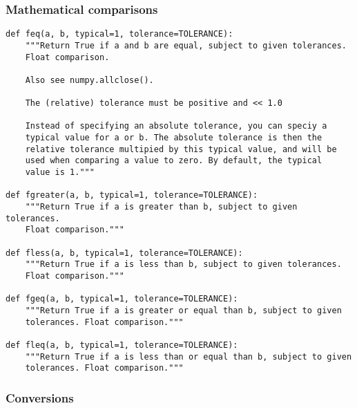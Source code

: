 \documentclass[a4paper,10pt]{article}
\begin{document}
\subsubsection{Mathematical comparisons}
\begin{verbatim}
def feq(a, b, typical=1, tolerance=TOLERANCE):
    """Return True if a and b are equal, subject to given tolerances.  
    Float comparison.

    Also see numpy.allclose().

    The (relative) tolerance must be positive and << 1.0

    Instead of specifying an absolute tolerance, you can speciy a 
    typical value for a or b. The absolute tolerance is then the 
    relative tolerance multipied by this typical value, and will be 
    used when comparing a value to zero. By default, the typical 
    value is 1."""

def fgreater(a, b, typical=1, tolerance=TOLERANCE):
    """Return True if a is greater than b, subject to given tolerances.  
    Float comparison."""

def fless(a, b, typical=1, tolerance=TOLERANCE):
    """Return True if a is less than b, subject to given tolerances.  
    Float comparison."""

def fgeq(a, b, typical=1, tolerance=TOLERANCE):
    """Return True if a is greater or equal than b, subject to given 
    tolerances. Float comparison."""

def fleq(a, b, typical=1, tolerance=TOLERANCE):
    """Return True if a is less than or equal than b, subject to given 
    tolerances. Float comparison."""

\end{verbatim}

\subsubsection{Conversions}
\end{document}
